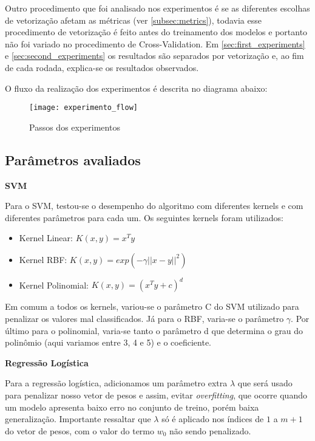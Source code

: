 Outro procedimento que foi analisado nos experimentos é se as diferentes escolhas de vetorização afetam
as métricas (ver \ref{subsec:metrics}), todavia esse procedimento de vetorização é feito antes 
do treinamento dos modelos e portanto não foi variado no procedimento de Cross-Validation. 
Em \ref{sec:first_experiments} e \ref{sec:second_experiments} 
os resultados são separados por vetorização e, ao fim de cada rodada, explica-se os resultados 
observados.

O fluxo da realização dos experimentos é descrita no diagrama abaixo:

\begin{figure}[H]
\label{fig:diagram}
	\texttt{[image: experimento\_flow]}
	\caption{Passos dos experimentos}
\end{figure}

\subsection{Parâmetros avaliados}
\label{subsec:parameters}

\textbf{SVM}

Para o SVM, testou-se o desempenho do algoritmo com diferentes kernels e com diferentes
parâmetros para cada um. Os seguintes kernels foram utilizados:

\begin{itemize}
	\item Kernel Linear: $K(x, y) = x^Ty$
	\item Kernel RBF: $K(x, y) = exp(-\gamma||x - y||^2)$
	\item Kernel Polinomial: $K(x, y) = (x^Ty + c)^d$
\end{itemize}

Em comum a todos os kernels, variou-se o parâmetro C do SVM utilizado para penalizar os valores
mal classificados. Já para o RBF, varia-se o parâmetro $\gamma$. Por último para o polinomial,
varia-se tanto o parâmetro d que determina o grau do polinômio (aqui variamos entre 3, 4 e 5) e o coeficiente.

\textbf{Regressão Logística}

Para a regressão logística, adicionamos um parâmetro extra $\lambda$ que será usado para penalizar
nosso vetor de pesos e assim, evitar \textit{overfitting}, que ocorre quando um modelo apresenta
baixo erro no conjunto de treino, porém baixa generalização. 
Importante ressaltar que $\lambda$ só é aplicado nos índices
de $1$ a $m + 1$ do vetor de pesos, com o valor do termo $w_0$ não sendo penalizado.


